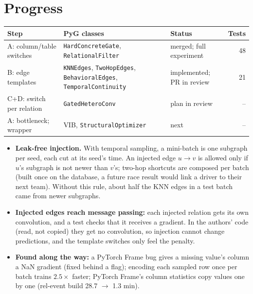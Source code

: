 \documentclass{article}
\newcommand{\code}[1]{\texttt{#1}}
\begin{document}
\section{Progress}
\vspace{-0.4em}
\begin{center}
\vspace{-0.5em}
\small
\begin{tabular}{@{}>{\raggedright\arraybackslash}p{3.1cm}>{\raggedright\arraybackslash}p{5.3cm}>{\raggedright\arraybackslash}p{3.6cm}r@{}}
\toprule
Step & PyG classes & Status & Tests \\
\midrule
A: column/table switches & \code{HardConcreteGate}, \code{RelationalFilter} & merged; full experiment & 48 \\
B: edge templates & \code{KNNEdges}, \code{TwoHopEdges}, \code{BehavioralEdges}, \code{TemporalContinuity} & implemented; PR in review & 21 \\
C+D: switch per relation & \code{GatedHeteroConv} & plan in review & -- \\
A: bottleneck; wrapper & VIB, \code{StructuralOptimizer} & next & -- \\
\bottomrule
\end{tabular}
\vspace{-0.4em}
\end{center}
\begin{itemize}
\item \textbf{Leak-free injection.} With temporal sampling, a mini-batch is one subgraph per seed,
  each cut at its seed's time. An injected edge $u \to v$ is allowed only if $u$'s subgraph is not
  newer than $v$'s; two-hop shortcuts are composed per batch (built once on the database, a future
  race result would link a driver to their next team). Without this rule, about half the KNN edges
  in a test batch came from newer subgraphs.
\item \textbf{Injected edges reach message passing:} each injected relation gets its own convolution,
  and a test checks that it receives a gradient. In the authors' code (read, not copied) they get no
  convolution, so injection cannot change predictions, and the template switches only feel the penalty.
\item \textbf{Found along the way:} a PyTorch Frame bug gives a missing value's column a NaN
  gradient (fixed behind a flag); encoding each sampled row once per batch trains $2.5\times$ faster;
  PyTorch Frame's column statistics copy values one by one (rel-event build 28.7 $\to$ 1.3 min).
\end{itemize}
\end{document}
